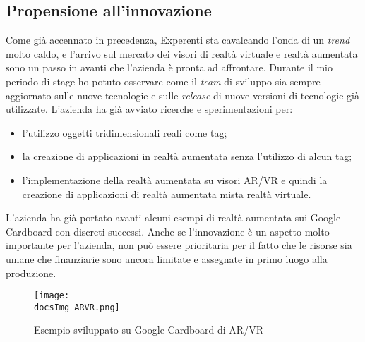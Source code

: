 \subsection{Propensione all'innovazione}
Come gi\`a accennato in precedenza, Experenti sta cavalcando l'onda di un \textit{trend} molto caldo, e l'arrivo sul mercato dei visori di realt\`a virtuale e realt\`a aumentata sono un passo in avanti che l'azienda \`e pronta ad affrontare. Durante il mio periodo di stage ho potuto osservare come il \textit{team} di sviluppo sia sempre aggiornato sulle nuove tecnologie e sulle \textit{release} di nuove versioni di tecnologie gi\`a utilizzate.
L'azienda ha gi\`a avviato ricerche e sperimentazioni per:
\begin{itemize}
	\item l'utilizzo oggetti tridimensionali reali come tag;
	\item la creazione di applicazioni in realt\`a aumentata senza l'utilizzo di alcun tag;
	\item l'implementazione della realt\`a aumentata su visori AR/VR e quindi la creazione di applicazioni di realt\`a aumentata mista realt\`a virtuale.
\end{itemize}
L'azienda ha gi\`a portato avanti alcuni esempi di realt\`a aumentata sui Google Cardboard con discreti successi.
Anche se l'innovazione \`e un aspetto molto importante per l'azienda, non pu\`o essere prioritaria per il fatto che le risorse sia umane che finanziarie sono ancora limitate e assegnate in primo luogo alla produzione.

\begin{figure}[H]
	\centering
	\texttt{[image: \\docsImg ARVR.png]}
	\caption{Esempio sviluppato su Google Cardboard di AR/VR}
	\label{fig:Esempio sviluppato su Google Cardboard di AR/VR}
\end{figure}